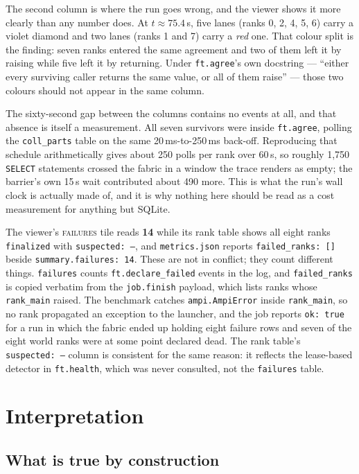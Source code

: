 \documentclass[11pt]{article}
\begin{document}
The second column is where the run goes wrong, and the viewer shows it more clearly than
any number does. At $t\approx75.4$\,s, five lanes (ranks 0, 2, 4, 5, 6) carry a violet
diamond and two lanes (ranks 1 and 7) carry a \emph{red} one. That colour split is the
finding: seven ranks entered the same agreement and two of them left it by raising while
five left it by returning. Under \texttt{ft.agree}'s own docstring --- ``either every
surviving caller returns the same value, or all of them raise'' --- those two colours
should not appear in the same column.

The sixty-second gap between the columns contains no events at all, and that absence is
itself a measurement. All seven survivors were inside \texttt{ft.agree}, polling the
\texttt{coll\_parts} table on the same 20\,ms-to-250\,ms back-off. Reproducing that
schedule arithmetically gives about 250 polls per rank over 60\,s, so roughly 1{,}750
\texttt{SELECT} statements crossed the fabric in a window the trace renders as empty; the
barrier's own 15\,s wait contributed about 490 more. This is what the run's wall clock is
actually made of, and it is why nothing here should be read as a cost measurement for
anything but SQLite.

The viewer's \textsc{failures} tile reads \textbf{14} while its rank table shows all eight
ranks \texttt{finalized} with \texttt{suspected:\ --}, and \texttt{metrics.json} reports
\texttt{failed\_ranks:\ []} beside \texttt{summary.failures:\ 14}. These are not in
conflict; they count different things. \texttt{failures} counts
\texttt{ft.declare\_failed} events in the log, and \texttt{failed\_ranks} is copied
verbatim from the \texttt{job.finish} payload, which lists ranks whose \texttt{rank\_main}
raised. The benchmark catches \texttt{ampi.AmpiError} inside \texttt{rank\_main}, so no
rank propagated an exception to the launcher, and the job reports \texttt{ok:\ true} for a
run in which the fabric ended up holding eight failure rows and seven of the eight world
ranks were at some point declared dead. The rank table's \texttt{suspected:\ --} column is
consistent for the same reason: it reflects the lease-based detector in \texttt{ft.health},
which was never consulted, not the \texttt{failures} table.

\section{Interpretation}

\subsection{What is true by construction}
\end{document}
